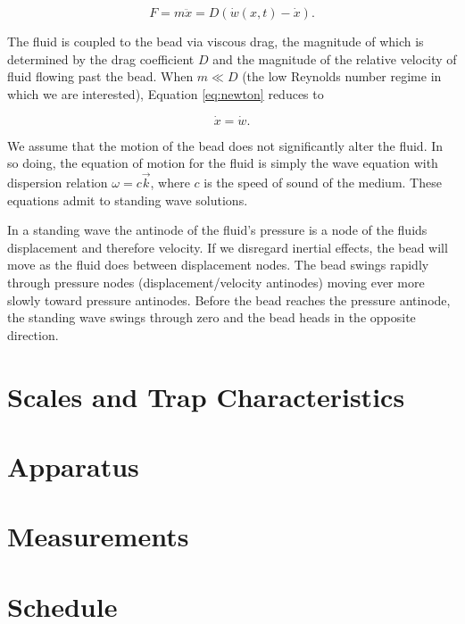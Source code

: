 \begin{equation}
F = m \ddot{x} = D\left(\dot{w}\left(x,t\right)-\dot{x}\right)\label{eq:newton}.
\end{equation}

The fluid is coupled to the bead via viscous drag, the magnitude of which is determined by the drag coefficient $D$ and the magnitude of the relative velocity of fluid flowing past the bead.   When $m \ll D$ (the low Reynolds number regime in which we are interested), Equation \ref{eq:newton} reduces to

\begin{equation}
\dot{x} = \dot{w}.
\end{equation}

We assume that the motion of the bead does not significantly alter the fluid.  In so doing, the equation of motion for the fluid is simply the wave equation with dispersion relation $\omega = c \vec{k}$, where $c$ is the speed of sound of the medium.  These equations admit to standing wave solutions.

In a standing wave the antinode of the fluid's pressure is a node of the fluids displacement and therefore velocity. If we disregard inertial effects, the bead will move as the fluid does between displacement nodes. The bead swings rapidly through pressure nodes (displacement/velocity antinodes) moving ever more slowly toward pressure antinodes. Before the bead reaches the pressure antinode, the standing wave swings through zero and the bead heads in the opposite direction.

\section{Scales and Trap Characteristics}

\section{Apparatus}

\section{Measurements}

\section{Schedule}








